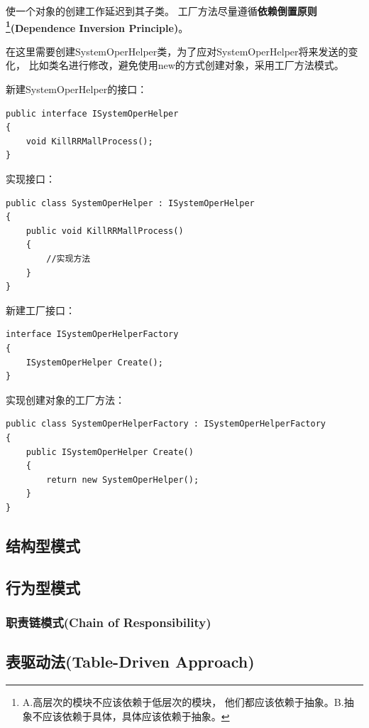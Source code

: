 \documentclass{book}
\begin{document}
使一个对象的创建工作延迟到其子类。
工厂方法尽量遵循\textbf{依赖倒置原则\footnote{A.高层次的模块不应该依赖于低层次的模块，
他们都应该依赖于抽象。B.抽象不应该依赖于具体，具体应该依赖于抽象。}(Dependence Inversion Principle)}。

在这里需要创建SystemOperHelper类，为了应对SystemOperHelper将来发送的变化，
比如类名进行修改，避免使用new的方式创建对象，采用工厂方法模式。

新建SystemOperHelper的接口：

\begin{lstlisting}[language={[Sharp]C}]
public interface ISystemOperHelper
{
    void KillRRMallProcess();    
}
\end{lstlisting}

实现接口：

\begin{lstlisting}[language={[Sharp]C}]
public class SystemOperHelper : ISystemOperHelper
{
	public void KillRRMallProcess()
	{
		//实现方法
	}
}
\end{lstlisting}

新建工厂接口：

\begin{lstlisting}[language={[Sharp]C}]
interface ISystemOperHelperFactory
{
    ISystemOperHelper Create();
}
\end{lstlisting}

实现创建对象的工厂方法：

\begin{lstlisting}[language={[Sharp]C}]
 public class SystemOperHelperFactory : ISystemOperHelperFactory
{
    public ISystemOperHelper Create()
    {
        return new SystemOperHelper();
    }        
}    
\end{lstlisting}


\subsection{结构型模式}

\subsection{行为型模式}

\subsubsection{职责链模式(Chain of Responsibility)}

\subsection{表驱动法(Table-Driven Approach)}
\end{document}
